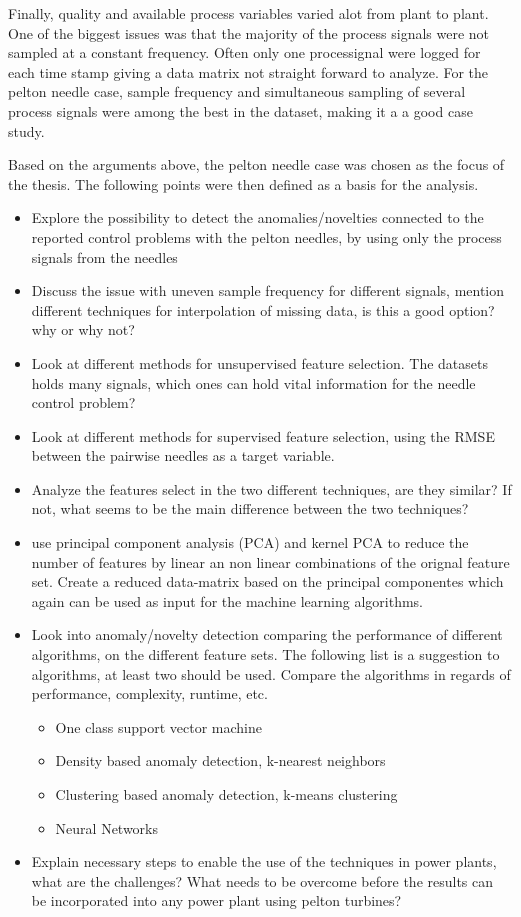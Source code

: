 Finally, quality and available process variables varied alot from plant to plant. One of the biggest issues was that the majority of the process signals were not sampled at a constant frequency. Often only one processignal were logged for each time stamp giving a data matrix not straight forward to analyze. For the pelton needle case, sample frequency and simultaneous sampling of several process signals were among the best in the dataset, making it a a good case study.  


Based on the arguments above, the pelton needle case was chosen as the focus of the thesis. The following points were then defined as a basis for the analysis. 

\begin{itemize}
    \item Explore the possibility to detect the anomalies/novelties connected to the reported control problems with the pelton needles, by using only the process signals from the needles  
    \item Discuss the issue with uneven sample frequency for different signals, mention different techniques for interpolation of missing data, is this a good option? why or why not? 
    \item Look at different methods for unsupervised feature selection. The datasets holds many signals, which ones can hold vital information for the needle control problem? 
    \item Look at different methods for supervised feature selection, using the RMSE between the pairwise needles as a target variable. 
    \item Analyze the features select in the two different techniques, are they similar? If not, what seems to be the main difference between the two techniques? 
    \item use principal component analysis (PCA) and kernel PCA to reduce the number of features by linear an non linear combinations of the orignal feature set. Create a reduced data-matrix based on the principal componentes which again can be used as input for the machine learning algorithms. 
    \item Look into anomaly/novelty detection comparing the performance of different algorithms, on the different feature sets. The following list is a suggestion to algorithms, at least two should be used. Compare the algorithms in regards of performance, complexity, runtime, etc. 
    \begin{itemize}
        \item One class support vector machine
        \item Density based anomaly detection, k-nearest neighbors
        \item Clustering based anomaly detection, k-means clustering 
        \item Neural Networks 
    \end{itemize}
    \item Explain necessary steps to enable the use of the techniques in power plants, what are the challenges? What needs to be overcome before the results can be incorporated into any power plant using pelton turbines?     
    
\end{itemize}
